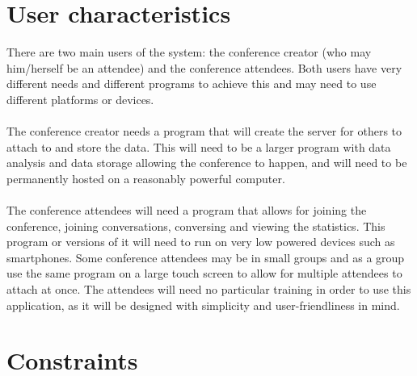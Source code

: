 \documentclass[12p, a4paper, onecolumn]{report}
\begin{document}
\section{User characteristics}

There are two main users of the system: the conference creator (who may him/herself be an attendee) and the conference attendees. Both users have very different needs and different programs to achieve this and may need to use different platforms or devices. \\ \\
The conference creator needs a program that will create the server for others to attach to and store the data. This will need to be a larger program with data analysis and data storage allowing the conference to happen, and will need to be permanently hosted on a reasonably powerful computer. \\ \\
The conference attendees will need a program that allows for joining the conference, joining conversations, conversing and viewing the statistics. This program or versions of it will need to run on very low powered devices such as smartphones. Some conference attendees may be in small groups and as a group use the same program on a large touch screen to allow for multiple attendees to attach at once. The attendees will need no particular training in order to use this application, as it will be designed with simplicity and user-friendliness in mind.

\section{Constraints}
\end{document}
